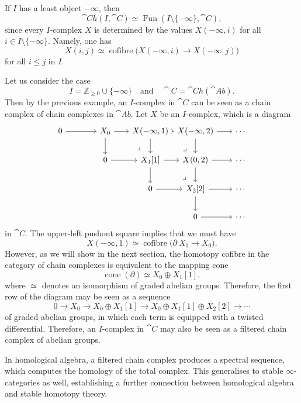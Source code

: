 \begin{remark}
    If $I$ has a least object $-\infty$, then
    \[ \cat{Ch}(I,\cat{C})\simeq\operatorname{Fun}(I\setminus\{-\infty\},\cat{C}), \]
    since every $I$-complex $X$ is determined by the values $X(-\infty,i)$
    for all $i\in I\setminus\{-\infty\}$. Namely, one has 
    \[ X(i,j)\simeq\operatorname{cofibre}\bigl(X(-\infty,i)\to X(-\infty,j)\bigr) \]
    for all $i\leq j$ in $I$. \varqed
\end{remark}

\begin{example}
    Let us consider the case
    \[I=\mathbb{Z}_{\geq0}\cup\{-\infty\}\quad\text{and}\quad
    \cat{C}=\cat{Ch}(\cat{Ab}).\]
    Then by the previous example, 
    an $I$-complex in $\cat{C}$ can be seen as
    a chain complex of chain complexes in $\cat{Ab}$.
    Let $X$ be an $I$-complex, which is a diagram 
    \[\begin{tikzcd}[column sep={5.5em,between origins}]
        0\ar[r] & X_0\ar[r]\ar[d]\ar[dr,phantom,end anchor={[xshift=-.5em]north},pos=.75,"\lrcorner"] &
        X(-\infty,1)\ar[r]\ar[d]\ar[dr,phantom,end anchor={[xshift=-.5em]north},pos=.75,"\lrcorner"] &
        X(-\infty,2)\ar[r]\ar[d] & \cdots \\
        & 0\ar[r] & X_1[1]\ar[r]\ar[d]\ar[dr,phantom,end anchor={[xshift=-.5em]north},pos=.75,"\lrcorner"] &
        X(0,2) \ar[r]\ar[d] & \cdots \\
        && 0\ar[r] & X_2[2]\ar[r]\ar[d] & \cdots \\
        &&& 0\ar[r] & \cdots
    \end{tikzcd}\]
    in $\cat{C}$. The upper-left pushout square implies that we must have
    \[X(-\infty,1)\simeq\operatorname{cofibre}\bigl(\partial\:X_1\to X_0\bigr).\]
    However, as we will show in the next section,
    the homotopy cofibre in the category of chain complexes 
    is equivalent to the mapping cone
    \[\operatorname{cone}(\partial)\simeq X_0\oplus X_1[1],\]
    where $\simeq$ denotes an isomorphism of graded abelian groups.
    Therefore, the first row of the diagram may be seen as a sequence 
    \[0\to X_0\to X_0\oplus X_1[1]\to X_0\oplus X_1[1]\oplus X_2[2]\to\cdots\]
    of graded abelian groups,
    in which each term is equipped with a twisted differential.
    Therefore, an $I$-complex in $\cat{C}$
    may also be seen as a filtered chain complex 
    of abelian groups. \varqed
\end{example}

In homological algebra, a filtered chain complex produces a spectral sequence,
which computes the homology of the total complex.
This generalises to stable $\infty$-categories as well,
establishing a further connection between homological algebra
and stable homotopy theory.

